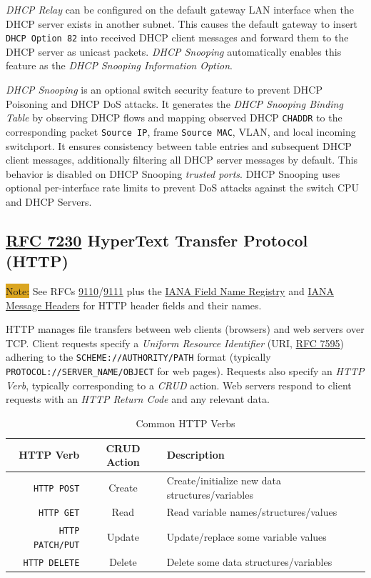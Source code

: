 \documentclass[12pt]{article}
\newcommand{\note}[1]{\colorbox{#1}{Note:}}
\newcommand{\rfc}[1]{\href{https://datatracker.ietf.org/doc/html/rfc#1}{#1}}
\newcommand{\RFC}[1]{\href{https://datatracker.ietf.org/doc/html/rfc#1}{RFC #1}}
\begin{document}
	\textit{DHCP Relay} can be configured on the default gateway LAN interface when the DHCP server exists in another subnet. This causes the default gateway to insert \texttt{DHCP Option 82} into received DHCP client messages and forward them to the DHCP server as unicast packets. \textit{DHCP Snooping} automatically enables this feature as the \textit{DHCP Snooping Information Option}.

	\textit{DHCP Snooping} is an optional switch security feature to prevent DHCP Poisoning and DHCP DoS attacks. It generates the \textit{DHCP Snooping Binding Table} by observing DHCP flows and mapping observed DHCP \texttt{CHADDR} to the corresponding packet \texttt{Source IP}, frame \texttt{Source MAC}, VLAN, and local incoming switchport. It ensures consistency between table entries and subsequent DHCP client messages, additionally filtering all DHCP server messages by default. This behavior is disabled on DHCP Snooping \textit{trusted ports}. DHCP Snooping uses optional per-interface rate limits to prevent DoS attacks against the switch CPU and DHCP Servers.


	\subsection[RFC 7230 HTTP]{\RFC{7230} HyperText Transfer Protocol (HTTP) \label{subsec:HTTP}}
	\note{Goldenrod} See RFCs \rfc{9110}/\rfc{9111} plus the \href{https://www.iana.org/assignments/http-fields/http-fields.xhtml#field-names}{IANA Field Name Registry} and \href{https://www.iana.org/assignments/message-headers/message-headers.xml#perm-headers}{IANA Message Headers} for HTTP header fields and their names.

	HTTP manages file transfers between web clients (browsers) and web servers over TCP. Client requests specify a \textit{Uniform Resource Identifier} (URI, \RFC{7595}) adhering to the \texttt{SCHEME://AUTHORITY/PATH} format (typically \texttt{PROTOCOL://SERVER\_NAME/OBJECT} for web pages). Requests also specify an \textit{HTTP Verb}, typically corresponding to a \textit{CRUD} action. Web servers respond to client requests with an \textit{HTTP Return Code} and any relevant data.

	\begin{table}[H]
	\centering
	\caption{Common HTTP Verbs \label{tab:HTTP VERBS}}
	\begin{tabular}{r | c | l}
	\hline
	\textbf{HTTP Verb}		& \textbf{CRUD Action}	& \textbf{Description}\\\hline
	\texttt{HTTP POST}		& Create			& Create/initialize new data structures/variables\\\hline
	\texttt{HTTP GET}			& Read			& Read variable names/structures/values\\\hline
	\texttt{HTTP PATCH/PUT}	& Update			& Update/replace some variable values\\\hline
	\texttt{HTTP DELETE}		& Delete			& Delete some data structures/variables\\\hline
	\end{tabular}\end{table}
\end{document}
